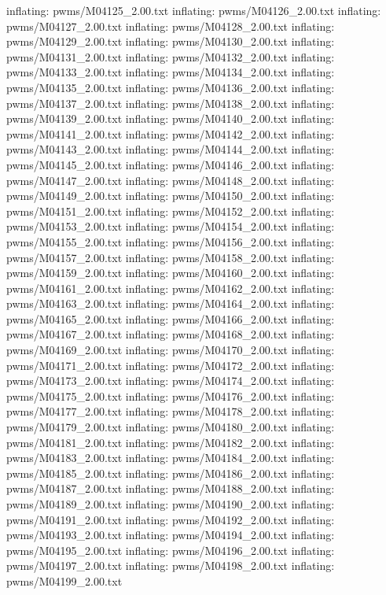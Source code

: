 \documentclass[letterpaper,10pt,english]{sphinxmanual}
\begin{document}
{\begin{sphinxVerbatim}[commandchars=\\\{\}]
  inflating: pwms/M04125\_2.00.txt
  inflating: pwms/M04126\_2.00.txt
  inflating: pwms/M04127\_2.00.txt
  inflating: pwms/M04128\_2.00.txt
  inflating: pwms/M04129\_2.00.txt
  inflating: pwms/M04130\_2.00.txt
  inflating: pwms/M04131\_2.00.txt
  inflating: pwms/M04132\_2.00.txt
  inflating: pwms/M04133\_2.00.txt
  inflating: pwms/M04134\_2.00.txt
  inflating: pwms/M04135\_2.00.txt
  inflating: pwms/M04136\_2.00.txt
  inflating: pwms/M04137\_2.00.txt
  inflating: pwms/M04138\_2.00.txt
  inflating: pwms/M04139\_2.00.txt
  inflating: pwms/M04140\_2.00.txt
  inflating: pwms/M04141\_2.00.txt
  inflating: pwms/M04142\_2.00.txt
  inflating: pwms/M04143\_2.00.txt
  inflating: pwms/M04144\_2.00.txt
  inflating: pwms/M04145\_2.00.txt
  inflating: pwms/M04146\_2.00.txt
  inflating: pwms/M04147\_2.00.txt
  inflating: pwms/M04148\_2.00.txt
  inflating: pwms/M04149\_2.00.txt
  inflating: pwms/M04150\_2.00.txt
  inflating: pwms/M04151\_2.00.txt
  inflating: pwms/M04152\_2.00.txt
  inflating: pwms/M04153\_2.00.txt
  inflating: pwms/M04154\_2.00.txt
  inflating: pwms/M04155\_2.00.txt
  inflating: pwms/M04156\_2.00.txt
  inflating: pwms/M04157\_2.00.txt
  inflating: pwms/M04158\_2.00.txt
  inflating: pwms/M04159\_2.00.txt
  inflating: pwms/M04160\_2.00.txt
  inflating: pwms/M04161\_2.00.txt
  inflating: pwms/M04162\_2.00.txt
  inflating: pwms/M04163\_2.00.txt
  inflating: pwms/M04164\_2.00.txt
  inflating: pwms/M04165\_2.00.txt
  inflating: pwms/M04166\_2.00.txt
  inflating: pwms/M04167\_2.00.txt
  inflating: pwms/M04168\_2.00.txt
  inflating: pwms/M04169\_2.00.txt
  inflating: pwms/M04170\_2.00.txt
  inflating: pwms/M04171\_2.00.txt
  inflating: pwms/M04172\_2.00.txt
  inflating: pwms/M04173\_2.00.txt
  inflating: pwms/M04174\_2.00.txt
  inflating: pwms/M04175\_2.00.txt
  inflating: pwms/M04176\_2.00.txt
  inflating: pwms/M04177\_2.00.txt
  inflating: pwms/M04178\_2.00.txt
  inflating: pwms/M04179\_2.00.txt
  inflating: pwms/M04180\_2.00.txt
  inflating: pwms/M04181\_2.00.txt
  inflating: pwms/M04182\_2.00.txt
  inflating: pwms/M04183\_2.00.txt
  inflating: pwms/M04184\_2.00.txt
  inflating: pwms/M04185\_2.00.txt
  inflating: pwms/M04186\_2.00.txt
  inflating: pwms/M04187\_2.00.txt
  inflating: pwms/M04188\_2.00.txt
  inflating: pwms/M04189\_2.00.txt
  inflating: pwms/M04190\_2.00.txt
  inflating: pwms/M04191\_2.00.txt
  inflating: pwms/M04192\_2.00.txt
  inflating: pwms/M04193\_2.00.txt
  inflating: pwms/M04194\_2.00.txt
  inflating: pwms/M04195\_2.00.txt
  inflating: pwms/M04196\_2.00.txt
  inflating: pwms/M04197\_2.00.txt
  inflating: pwms/M04198\_2.00.txt
  inflating: pwms/M04199\_2.00.txt

\end{sphinxVerbatim}}
\end{document}
